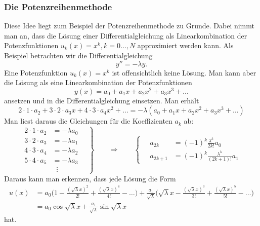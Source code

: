 \subsubsection{Die Potenzreihenmethode}
Diese Idee liegt zum Beispiel der Potenzreihenmethode zu Grunde.
Dabei nimmt man an, dass die Lösung einer Differentialgleichung als
Linearkombination der Potenzfunktionen $u_k(x)=x^k, k=0\dots,N$
approximiert werden kann.
Als Beispiel betrachten wir die Differentialgleichung
\[
y''=-\lambda y.
\]
Eine Potenzfunktion $u_k(x)=x^k$ ist offensichtlich keine Lösung.
Man kann aber die Lösung als eine Linearkombination
der Potenzfunktionen
\[
y(x)
=
a_0+a_1x+a_2x^2+a_3x^3+\dots
\]
ansetzen und in die Differentialgleichung einsetzen.
Man erhält
\[
2\cdot 1 \cdot a_2
+
3\cdot 2 \cdot a_3x
+
4\cdot 3 \cdot a_4x^2
+
\dots
=
-\lambda(
a_0+a_1x+a_2x^2+a_3x^3+\dots)
\]
Man liest daraus die Gleichungen für die Koeffizienten $a_k$ ab:
\begin{equation*}
\left.
\begin{aligned}
2\cdot 1\cdot a_2&=-\lambda a_0\\
3\cdot 2\cdot a_3&=-\lambda a_1\\
4\cdot 3\cdot a_4&=-\lambda a_2\\
5\cdot 4\cdot a_5&=-\lambda a_3\\
&\;\;\vdots
\end{aligned}
\quad
\right\}
\qquad\Rightarrow\qquad
\left\{
\quad
\begin{aligned}
a_{2k}  &=(-1)^k\frac{\lambda^k}{ 2k!   }a_0\\
a_{2k+1}&=(-1)^k\frac{\lambda^k}{(2k+1)!}a_1
\end{aligned}
\right.
\end{equation*}
Daraus kann man erkennen, dass jede Lösung die Form
\begin{align*}
u(x)
&=
a_0
\biggl(
1-\frac{(\sqrt{\lambda}x)^2}{2!} + \frac{(\sqrt{\lambda}x)^4}{4!}-\dots
\biggr)
+
\frac{a_1}{\sqrt{\lambda}}
\biggl(
\sqrt{\lambda}x
-
\frac{(\sqrt{\lambda}x)^3}{3!} + \frac{(\sqrt{\lambda}x)^5}{5!}-\dots
\biggr)
\\
&= a_0 \cos \sqrt{\lambda}x
+ \frac{a_1}{\sqrt{\lambda}} \sin\sqrt{\lambda}x
\end{align*}
hat.

